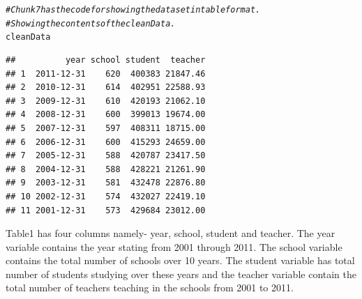\documentclass{article}\usepackage[]{graphicx}\usepackage[]{color}
\makeatletter
\newcommand{\hlcom}[1]{\textcolor[rgb]{0.678,0.584,0.686}{\textit{#1}}}%
\newcommand{\hlstd}[1]{\textcolor[rgb]{0.345,0.345,0.345}{#1}}%
\newenvironment{kframe}{%
 \def\at@end@of@kframe{}%
 \ifinner\ifhmode%
  \def\at@end@of@kframe{\end{minipage}}%
  \begin{minipage}{\columnwidth}%
 \fi\fi%
 \def\FrameCommand##1{\hskip\@totalleftmargin \hskip-\fboxsep
 \colorbox{shadecolor}{##1}\hskip-\fboxsep
     \hskip-\linewidth \hskip-\@totalleftmargin \hskip\columnwidth}%
 \MakeFramed {\advance\hsize-\width
   \@totalleftmargin\z@ \linewidth\hsize
   \@setminipage}}%
 {\par\unskip\endMakeFramed%
 \at@end@of@kframe}
\newenvironment{knitrout}{}{} %
\makeatother
\begin{document}
\begin{knitrout}
\color{fgcolor}\begin{kframe}
\begin{alltt}
\hlcom{# Chunk 7 has the code for showing the dataset in table format.}
\hlcom{# Showing the contents of the cleanData.}
\hlstd{cleanData}
\end{alltt}
\begin{verbatim}
##          year school student  teacher
## 1  2011-12-31    620  400383 21847.46
## 2  2010-12-31    614  402951 22588.93
## 3  2009-12-31    610  420193 21062.10
## 4  2008-12-31    600  399013 19674.00
## 5  2007-12-31    597  408311 18715.00
## 6  2006-12-31    600  415293 24659.00
## 7  2005-12-31    588  420787 23417.50
## 8  2004-12-31    588  428221 21261.90
## 9  2003-12-31    581  432478 22876.80
## 10 2002-12-31    574  432027 22419.10
## 11 2001-12-31    573  429684 23012.00
\end{verbatim}
\end{kframe}
\end{knitrout}
Table1 has four columns namely- year, school, student and teacher. The year variable contains the year stating from 2001 through 2011. The school variable contains the total number of schools over 10 years. The student variable has total number of students studying over these years and the teacher variable contain the total number of teachers teaching in the schools from 2001 to 2011.
\end{document}
